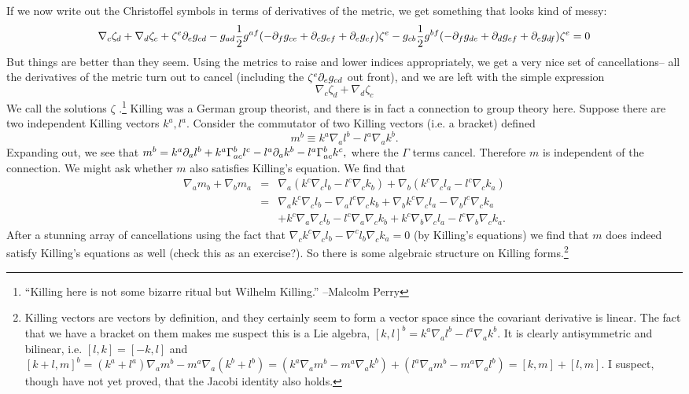 If we now write out the Christoffel symbols in terms of derivatives of the metric, we get something that looks kind of messy:
$$\nabla_c \zeta_d +\nabla_d \zeta_c +\zeta^e \partial_e g_{cd} -g_{ad} \frac{1}{2} g^{af}(-\partial_f g_{ce}+\partial_c g_{ef} +\partial_e g_{cf})\zeta^e - g_{cb}\frac{1}{2} g^{bf}(-\partial_f g_{de}+\partial_d g_{ef}+\partial_e g_{df})\zeta^e=0$$
But things are better than they seem. Using the metrics to raise and lower indices appropriately, we get a very nice set of cancellations-- all the derivatives of the metric turn out to cancel (including the $\zeta^e \partial_e g_{cd}$ out front), and we are left with the simple expression
$$\nabla_c \zeta_d +\nabla_d \zeta_c$$
We call the solutions $\zeta$ .\footnote{``Killing here is not some bizarre ritual but Wilhelm Killing.'' --Malcolm Perry} Killing was a German group theorist, and there is in fact a connection to group theory here. Suppose there are two independent Killing vectors $k^a,l^a$. Consider the commutator of two Killing vectors (i.e. a bracket) defined
$$m^b\equiv k^a\nabla_a l^b - l^a \nabla_a k^b.$$
Expanding out, we see that
$m^b=k^a\partial_a l^b+ k^a\Gamma^b_{ac} l^c - l^a \partial_a k^b - l^a \Gamma^b_{ac} k^c,$
where the $\Gamma$ terms cancel. Therefore $m$ is independent of the connection. We might ask whether $m$ also satisfies Killing's equation. We find that
\begin{eqnarray*}
\nabla_a m_b +\nabla_b m_a &=& \nabla_a (k^c \nabla_c l_b - l^c \nabla_c k_b)+\nabla_b (k^c \nabla_c l_a -l^c \nabla_c k_a)\\
&=& \nabla_a k^c \nabla_c l_b -\nabla_a l^c \nabla_c k_b + \nabla_b k^c \nabla_c l_a -\nabla_b l^c \nabla_c k_a\\
&&+k^c \nabla_a \nabla_c l_b - l^c \nabla_a \nabla_c k_b +k^c \nabla_b \nabla_c l_a - l^c \nabla_b \nabla_c k_a.
\end{eqnarray*}
After a stunning array of cancellations using the fact that $\nabla_c k^c \nabla_c l_b - \nabla^c l_b \nabla_c k_a=0$ (by Killing's equations) we find that $m$ does indeed satisfy Killing's equations as well (check this as an exercise?). So there is some algebraic structure on Killing forms.\footnote{Killing vectors are vectors by definition, and they certainly seem to form a vector space since the covariant derivative is linear. The fact that we have a bracket on them makes me suspect this is a Lie algebra, $[k,l]^b=k^a\nabla_a l^b - l^a \nabla_a k^b$. It is clearly antisymmetric and bilinear, i.e. $[l,k]=[-k,l]$ and $[k+l,m]^b=(k^a+l^a)\nabla_a m^b -m^a \nabla_a (k^b+l^b)=(k^a \nabla_a m^b - m^a \nabla_a k^b)+(l^a \nabla_a m^b - m^a \nabla_a l^b)=[k,m]+[l,m]$. I suspect, though have not yet proved, that the Jacobi identity also holds.}